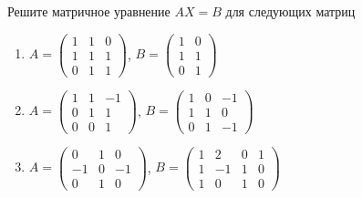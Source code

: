 \begin{exercise}
Решите матричное уравнение \(AX=B\) для следующих матриц
\begin{enumerate}
	\item \(A=\begin{pmatrix}
		1 & 1 & 0 \\ 1 & 1 & 1 \\ 0 & 1 & 1
	\end{pmatrix}\), \(B=\begin{pmatrix}
		1 & 0 \\ 1 & 1 \\ 0 & 1
	\end{pmatrix}\)
	\item \(A=\begin{pmatrix}
		1 & 1 & -1 \\ 0 & 1 & 1 \\ 0 & 0 & 1
	\end{pmatrix}\), \(B=\begin{pmatrix}
		1 & 0 & -1 \\ 1 & 1 & 0\\ 0 & 1 & -1
	\end{pmatrix}\)
	\item \(A=\begin{pmatrix}
		0 & 1 & 0 \\ -1 & 0 & -1 \\ 0 & 1 & 0
	\end{pmatrix}\), \(B=\begin{pmatrix}
		1 & 2 & 0 & 1 \\ 1 & -1 & 1 & 0\\ 1 & 0 & 1 & 0
	\end{pmatrix}\)
\end{enumerate}
\end{exercise}

